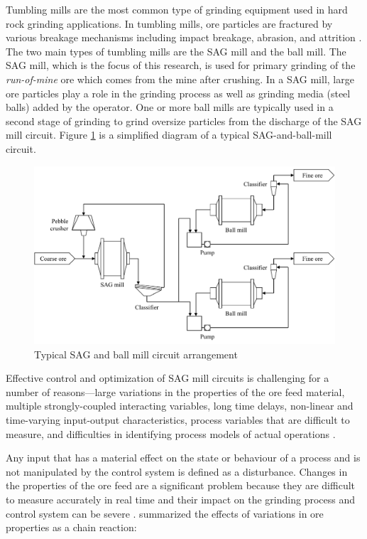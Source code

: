 Tumbling mills are the most common type of grinding equipment used in hard rock grinding applications. In tumbling mills, ore particles are fractured by various breakage mechanisms including impact breakage, abrasion, and attrition \citep{king_chapter_2012}. The two main types of tumbling mills are the \gls{SAG} mill and the ball mill. The \gls{SAG} mill, which is the focus of this research, is used for primary grinding of the \textit{run-of-mine} ore which comes from the mine after crushing. In a \gls{SAG} mill, large ore particles play a role in the grinding process as well as grinding media (steel balls) added by the operator. One or more ball mills are typically used in a second stage of grinding to grind oversize particles from the discharge of the \gls{SAG} mill circuit. Figure \ref{fig:sag-ball-circuit-diag} is a simplified diagram of a typical SAG-and-ball-mill circuit.%
\begin{figure}[htp]
	\centering
	\includegraphics[width=15cm]{images/sag-ball-circuit-diag.pdf}
	\caption{Typical \acrshort{SAG} and ball mill circuit arrangement} \label{fig:sag-ball-circuit-diag}
\end{figure}

Effective control and optimization of SAG mill circuits is challenging for a number of reasons---large variations in the properties of the ore feed material, multiple strongly-coupled interacting variables, long time delays, non-linear and time-varying input-output characteristics, process variables that are difficult to measure, and difficulties in identifying process models of actual operations \citep{olivier_dual_2012, gough_sag_2015, le_roux_throughput_2016, aguila-camacho_control_2017}. 

Any input that has a material effect on the state or behaviour of a process and is not manipulated by the control system is defined as a disturbance. Changes in the properties of the ore feed are a significant problem because they are difficult to measure accurately in real time and their impact on the grinding process and control system can be severe \citep{herbst_optimal_1988, garrido_multivariable_2009, remes_grinding_2010, liu_development_2018}. \cite{powell_applying_2009} summarized the effects of variations in ore properties as a chain reaction:

